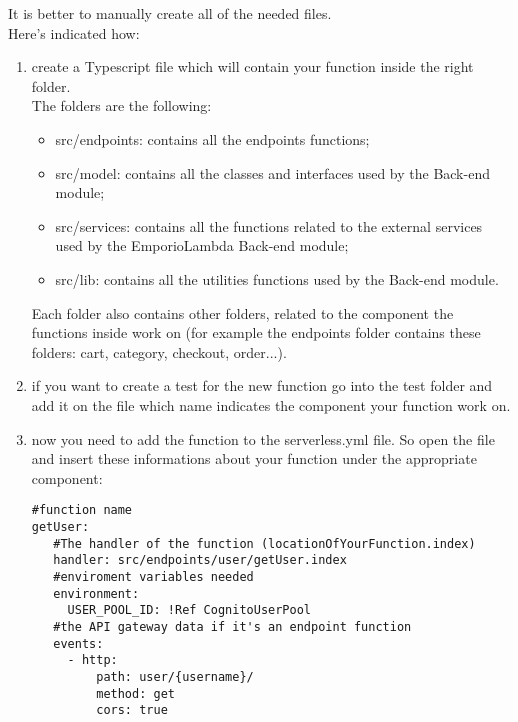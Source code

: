 It is better to manually create all of the needed files.\\
Here's indicated how:
\begin{enumerate}
\item create a Typescript file which will contain your function inside the right folder.\\The folders are the following:
\begin{itemize}
\item src/endpoints: contains all the endpoints functions;
\item src/model: contains all the classes and interfaces used by the Back-end module;
\item src/services: contains all the functions related to the external services used by the EmporioLambda Back-end module;
\item src/lib: contains all the utilities functions used by the Back-end module.
\end{itemize}
Each folder also contains other folders, related to the component the functions inside work on (for example the endpoints folder contains these folders: cart, category, checkout, order...). 
\item if you want to create a test for the new function go into the test folder and add it on the file which name indicates the component your function work on.
\item now you need to add the function to the serverless.yml file. So open the file and insert these informations about your function under the appropriate component:
\begin{lstlisting}
#function name
getUser:
   #The handler of the function (locationOfYourFunction.index)
   handler: src/endpoints/user/getUser.index
   #enviroment variables needed
   environment:
     USER_POOL_ID: !Ref CognitoUserPool
   #the API gateway data if it's an endpoint function
   events:
     - http:
         path: user/{username}/
         method: get
         cors: true
\end{lstlisting}
\end{enumerate}